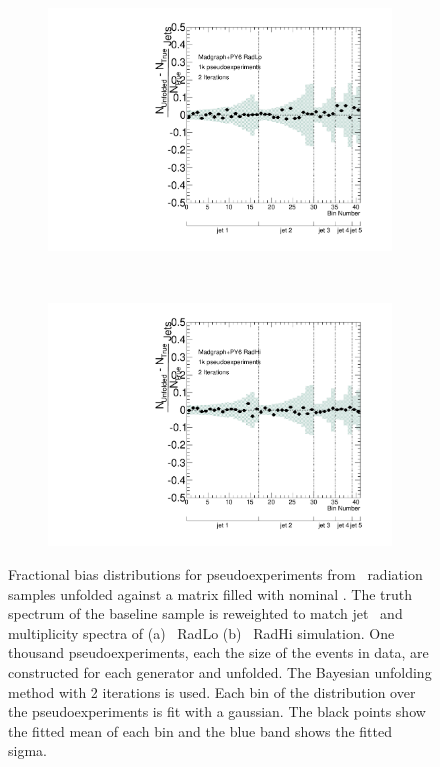 \begin{figure}
\begin{subfigure}[]{0.45\textwidth}
\includegraphics[width=\textwidth]{fig/Stress/110875atlfast/FracBias2Iterations.pdf}
\end{subfigure}
~
\begin{subfigure}[]{0.45\textwidth}
\includegraphics[width=\textwidth]{fig/Stress/110878atlfast/FracBias2Iterations.pdf}
\end{subfigure}
\label{fig:radbias}
\caption{
Fractional bias distributions for pseudoexperiments from \madpy\ radiation samples unfolded against a matrix filled with nominal \newline \madpy. The truth spectrum of the baseline sample is reweighted to match jet \pt\ and multiplicity spectra of (a) \madpy\ RadLo (b) \madpy\ RadHi simulation. One thousand pseudoexperiments, each the size of the events in data, are constructed for each generator and unfolded. The Bayesian unfolding method with 2 iterations is used. Each bin of the distribution over the pseudoexperiments is fit with a gaussian. The black points show the fitted mean of each bin and the blue band shows the fitted sigma.}
\end{figure}



